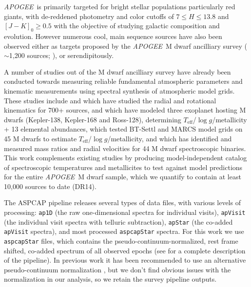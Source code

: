 \documentclass[twocolumn]{aastex62}
\newcommand{\apogee}{\textsl{APOGEE}}
\newcommand{\teff}{T_{\mathrm{eff}}}
\newcommand{\logg}{\log g}
\begin{document}
\apogee\ is primarily targeted for bright stellar populations particularly red giants, with de-reddened photometry and color cutoffs of $7 \leq H \leq 13.8$ and $[J-K]_0 \geq 0.5$ \citep{Zasowski:2013} with the objective of studying galactic composition and evolution. However numerous cool, main sequence sources have also been observed either as targets proposed by the \apogee\ M dwarf ancilliary survey ($\sim$1,200 sources; \citealt{Desphande:2013}), or serendipitously. 

A number of studies out of the M dwarf ancilliary survey have already been conducted towards measuring reliable fundamental atmospheric parameters and kinematic measurements using spectral synthesis of atmospheric model grids. 
These studies include \citealt{Desphande:2013} and \citealt{Gilhool:2018} which have studied the radial and rotational kinematics for 700+ sources,
\citealt{Souto:2017} and \citealt{Souto:2018} which have modeled three exoplanet hosting M dwarfs (Kepler-138, Kepler-168 and Ross-128), determining $\teff$/$\logg$/metallicity + 13 elemental abundances,
\citealt{Rajpurohit:2018} which tested BT-Settl \citep{Allard:2012} and MARCS \citep{Gustafsson:2008} model grids on 45 M dwarfs to estimate $\teff$/$\logg$/metallicity,
and \citealt{Skinner:2018} which has identified and measured mass ratios and radial velocities for 44 M dwarf spectroscopic binaries.
This work complements existing studies by producing model-independent catalog of spectroscopic temperatures and metallicites to test against model predictions for the entire \apogee\ M dwarf sample, which we quantify to contain at least 10,000 sources to date (DR14).

The ASPCAP pipeline releases several types of data files, with various levels of processing: {\tt\string ap1D} (the raw one-dimensional spectra for individual visits), {\tt\string apVisit} (the individual visit spectra with telluric subtraction), {\tt\string apStar} (the co-added {\tt\string apVisit} spectra), and most processed {\tt\string aspcapStar} spectra. For this work we use {\tt\string aspcapStar} files, which contains the pseudo-continuum-normalized, rest frame shifted, co-added spectrum of all observed epochs (see \citealt{Perez:2016} for a complete description of the pipeline).
In previous work it has been recommended to use an alternative pseudo-continuum normalization \citep{Ness:2015}, but we don't find obvious issues with the normalization in our analysis, so we retain the survey pipeline outputs.

\end{document}
